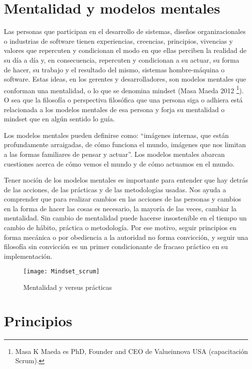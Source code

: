 \section{Mentalidad y modelos mentales}

Las personas que participan en el desarrollo de sistemas, diseños organizacionales o industrias de software tienen experiencias, creencias, principios, vivencias y valores que repercuten y condicionan el modo en que ellas perciben la realidad de su día a día y, en consecuencia, repercuten y condicionan a su actuar, su forma de hacer, su trabajo y el resultado del mismo, sistemas hombre-máquina o software. Estas ideas, en los gerentes y desarrolladores, son modelos mentales que conforman una mentalidad, o lo que se denomina mindset (Masa Maeda 2012 \footnote{Masa K Maeda es PhD, Founder and CEO de Valueinnova USA (capacitación Scrum).}). O sea que la filosofía o perspectiva filosófica que una persona siga o adhiera está relacionada a los modelos mentales de esa persona y forja su mentalidad o mindset que en algún sentido lo guía.

Los modelos mentales pueden definirse como: “imágenes internas, que están profundamente arraigadas, de cómo funciona el mundo, imágenes que nos limitan a las formas familiares de pensar y actuar”. Los modelos mentales abarcan cuestiones acerca de cómo vemos el mundo y de cómo actuamos en el mundo. 

Tener noción de los modelos mentales es importante para entender que hay detrás de las acciones, de las prácticas y de las metodologías usadas. Nos ayuda a comprender que para realizar cambios en las acciones de las personas y cambios en la forma de hacer las cosas es necesario, la mayoría de las veces, cambiar la mentalidad. Sin cambio de mentalidad puede hacerse insostenible en el tiempo un cambio de hábito, práctica o metodología. Por ese motivo, seguir principios en forma mecánica o por obediencia a la autoridad no forma convicción, y seguir una filosofía sin convicción es un primer condicionante de fracaso práctico en su implementación.

\begin{figure}[h]
  \centering
  \texttt{[image: Mindset\_scrum]}
  \caption{Mentalidad y versus prácticas}
  \centering
  \label{fig:Mindset_scrum} %
\end{figure}


\section{Principios}

